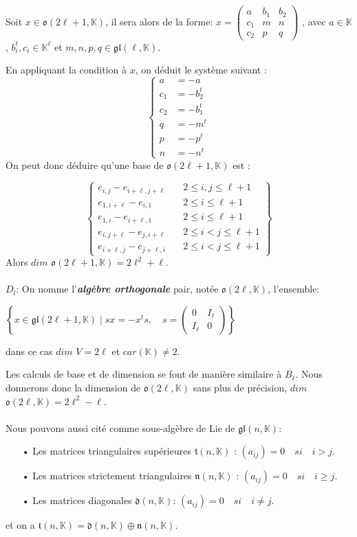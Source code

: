 \documentclass[a4paper,openany,12pt]{report}
\newcommand{\KK}{\mathbb{K}}
\newcommand{\gl}{\mathfrak{gl}}
\newcommand{\ttt}{\mathfrak{t}}
\newcommand{\nn}{\mathfrak{n}}
\newcommand{\dd}{\mathfrak{d}}
\newcommand{\oo}{\mathfrak{o}}
\theoremstyle{break}
{\theorembodyfont{\upshape}
\newtheorem*{rmq}{Remarque :}
\newtheorem*{prv}{Preuve :}
\newtheorem*{ex}{Exemples :}
\newtheorem*{exe}{Exemple : }
\newtheorem*{nota}{Notation :}
\newtheorem*{dem}{D\'emonstration :}}
\begin{document}
Soit $x \in \oo(2 \ell +1, \KK)$, il sera alors de la forme:
$x = 
\begin{pmatrix}
a & b_{1} & b_{2} \\
c_{1} & m & n \\
c_{2} & p & q 
\end{pmatrix} $
, avec $a \in \KK$, $b_{i}^t,c_{i} \in \KK^{\ell}$ et $m,n,p,q \in \gl(\ell,\KK)$.

En appliquant la condition à $x$, on déduit le système suivant :
\[ \left \{
\begin{aligned}
a & = -a \\
c_{1} & = -b_{2}^t \\
c_{2} & = -b_{1}^t \\
q & = -m^t \\
p & = -p^t \\
n & = -n^t
\end{aligned}
\right. \]
On peut donc déduire qu'une base de $\oo(2\ell+1,\KK)$ est :

\[ \left \{
\begin{aligned}
e_{i,j}-e_{i+\ell,j+\ell } & \quad 2\leq i,j \leq \ell+1\\
e_{1,i+\ell}-e_{i,1} & \quad 2 \leq i \leq \ell+1 \\
e_{1,i}-e_{i+\ell,1} & \quad 2 \leq i \leq \ell+1 \\ 
e_{i,j+\ell}-e_{j,i+\ell} & \quad 2 \leq i < j \leq \ell+1\\
e_{i+\ell,j}-e_{j+\ell,i} & \quad 2 \leq i < j \leq \ell+1
\end{aligned}
\right \} \]
Alors $dim$ $\oo(2\ell+1,\KK)=2\ell^2+\ell$.\\
\\
$ D_{l} $:  On nomme l'\textbf{\emph{algèbre orthogonale}} pair, notée  $\oo (2\ell,\KK)$, l'ensemble:
\begin{center}
$ \left \{ x \in \gl(2\ell+1, \KK) \mid sx= -x^ts, \quad s =\begin{pmatrix} 0 & I_\ell \\ I_\ell & 0 \end{pmatrix} \right \}$
\end{center}
dans ce cas $dim$ $V=2 \ell$ et $car(\KK) \ne 2$.

Les calculs de base et de dimension se font de manière similaire à $B_{\ell}$. Nous donnerons donc la dimension de $\oo(2\ell,\KK)$ sans plus de précision, $dim$ $\oo(2\ell,\KK)=2\ell^2-\ell$.\\
\\
\quad Nous pouvons aussi cité comme sous-algèbre de Lie de $\gl(n,\KK)$:
\begin{itemize}
\item[•] Les matrices triangulaires supérieures $\ttt(n,\KK)$ : $(a_{ij})= 0  \quad si \quad i>j.$

\item[•] Les matrices strictement  triangulaires  $ \nn(n,\KK) $ : $(a_{ij})= 0  \quad si \quad i \geq j.$

\item[•] Les matrices diagonales $\dd(n,\KK)$: $(a_{ij})= 0  \quad si \quad i \ne j .$
\end{itemize}
et on a $\ttt(n,\KK)=\dd(n,\KK) \oplus \nn(n,\KK)$.
\end{document}
